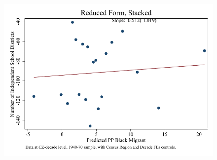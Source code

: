 \documentclass{article}
\begin{document}
\begin{figure}
\centering
\includegraphics{figures/simplefigs/stacked_schdist_ind_raw_C3_urban_rf.pdf}
\end{figure}
\clearpage
\end{document}
